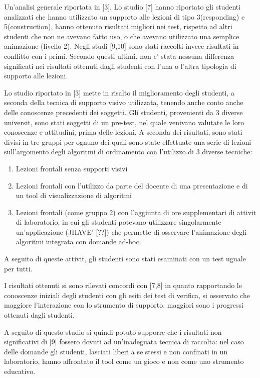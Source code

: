 Un'analisi generale  riportata in {[}3{]}. Lo studio {[}7{]} hanno
riportato gli studenti analizzati che hanno utilizzato un supporto
alle lezioni di tipo 3(responding) e 5(construction), hanno ottenuto
risultati migliori nei test, rispetto ad altri studenti che non ne
avevano fatto uso, o che avevano utilizzato una semplice animazione
(livello 2). Negli studi {[}9,10{]} sono stati raccolti invece risultati
in conflitto con i primi. Secondo questi ultimi, non c' stata nessuna
differenza significati nei risultati ottenuti dagli studenti con l'una
o l'altra tipologia di supporto alle lezioni.

Lo studio riportato in {[}3{]} mette in risalto il miglioramento degli
studenti, a seconda della tecnica di supporto visivo utilizzata, tenendo
anche conto anche delle conoscenze precedenti dei soggetti. Gli studenti,
provenienti da 3 diverse universit, sono stati soggetti di un pre-test,
nel quale venivano valutate le loro conoscenze e attitudini, prima
delle lezioni. A seconda dei risultati, sono stati divisi in tre gruppi
per ognuno dei quali sono state effettuate una serie di lezioni sull'argomento
degli algoritmi di ordinamento con l'utilizzo di 3 diverse tecniche:
\begin{enumerate}
\item Lezioni frontali senza supporti visivi
\item Lezioni frontali con l'utilizzo da parte del docente di una presentazione
e di un tool di visualizzazione di algoritmi
\item Lezioni frontali (come gruppo 2) con l'aggiunta di ore supplementari
di attivit di laboratorio, in cui gli studenti potevano utilizzare
singolarmente un'applicazione (JHAVE' {[}??{]}) che permette di osservare
l'animazione degli algoritmi integrata con domande ad-hoc.
\end{enumerate}
A seguito di queste attivit, gli studenti sono stati esaminati con
un test uguale per tutti.

I risultati ottenuti si sono rilevati concordi con {[}7,8{]} in quanto
rapportando le conoscenze iniziali degli studenti con gli esiti dei
test di verifica, si  osservato che maggiore  l'interazione con
lo strumento di supporto, maggiori sono i progressi ottenuti dagli
studenti.

A seguito di questo studio si  quindi potuto supporre che i risultati
non significativi di {[}9{]} fossero dovuti ad un'inadeguata tecnica
di raccolta: nel caso delle domande gli studenti, lasciati liberi
a se stessi e non confinati in un laboratorio, hanno affrontato il
tool come un gioco e non come uno strumento educativo.


